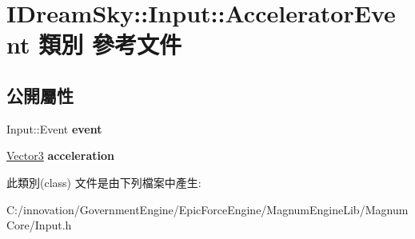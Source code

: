 \hypertarget{class_i_dream_sky_1_1_input_1_1_accelerator_event}{}\section{I\+Dream\+Sky\+:\+:Input\+:\+:Accelerator\+Event 類別 參考文件}
\label{class_i_dream_sky_1_1_input_1_1_accelerator_event}
\subsection*{公開屬性}
\begin{DoxyCompactItemize}
\item 
Input\+::\+Event {\bfseries event}\hypertarget{class_i_dream_sky_1_1_input_1_1_accelerator_event_af2097064e634353ec80aacfcec0b1e74}{}\label{class_i_dream_sky_1_1_input_1_1_accelerator_event_af2097064e634353ec80aacfcec0b1e74}

\item 
\hyperlink{class_i_dream_sky_1_1_vector3}{Vector3} {\bfseries acceleration}\hypertarget{class_i_dream_sky_1_1_input_1_1_accelerator_event_a4302f5c4fa088fab5d729fb25cf87591}{}\label{class_i_dream_sky_1_1_input_1_1_accelerator_event_a4302f5c4fa088fab5d729fb25cf87591}

\end{DoxyCompactItemize}


此類別(class) 文件是由下列檔案中產生\+:\begin{DoxyCompactItemize}
\item 
C\+:/innovation/\+Government\+Engine/\+Epic\+Force\+Engine/\+Magnum\+Engine\+Lib/\+Magnum\+Core/Input.\+h\end{DoxyCompactItemize}
